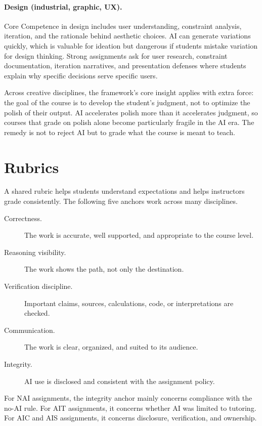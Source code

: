 \documentclass{SIAMbook2023}
\begin{document}
\paragraph{Design (industrial, graphic, UX).} Core Competence in design includes user understanding, constraint analysis, iteration, and the rationale behind aesthetic choices. AI can generate variations quickly, which is valuable for ideation but dangerous if students mistake variation for design thinking. Strong assignments ask for user research, constraint documentation, iteration narratives, and presentation defenses where students explain why specific decisions serve specific users.

Across creative disciplines, the framework's core insight applies with extra force: the goal of the course is to develop the student's judgment, not to optimize the polish of their output. AI accelerates polish more than it accelerates judgment, so courses that grade on polish alone become particularly fragile in the AI era. The remedy is not to reject AI but to grade what the course is meant to teach.

\section{Rubrics}
\label{i:sec:rubrics}%

A shared rubric helps students understand expectations and helps instructors grade consistently. The following five anchors work across many disciplines.

\begin{description}
\item[Correctness.] The work is accurate, well supported, and appropriate to the course level.
\item[Reasoning visibility.] The work shows the path, not only the destination.
\item[Verification discipline.] Important claims, sources, calculations, code, or interpretations are checked.
\item[Communication.] The work is clear, organized, and suited to its audience.
\item[Integrity.] AI use is disclosed and consistent with the assignment policy.
\end{description}

For NAI assignments, the integrity anchor mainly concerns compliance with the no-AI rule. For AIT assignments, it concerns whether AI was limited to tutoring. For AIC and AIS assignments, it concerns disclosure, verification, and ownership.
\end{document}
